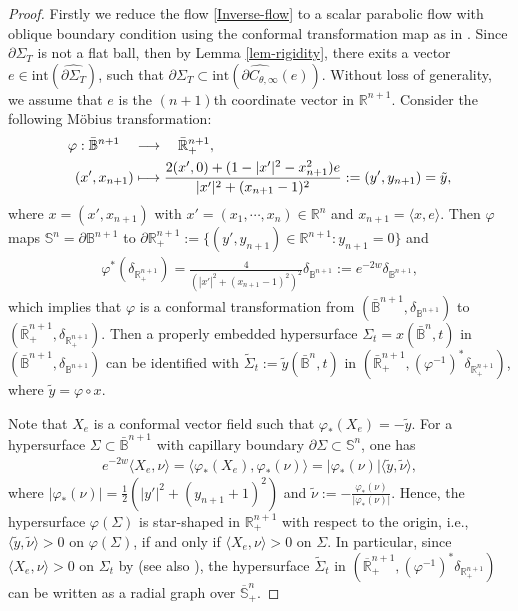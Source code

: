 \documentclass[11pt,reqno]{amsart}
\theoremstyle{definition}
\theoremstyle{remark}
\numberwithin{equation}{section}
\renewcommand{\(}{\left(}
\renewcommand{\)}{\right)}
\renewcommand{\widetilde}{\tilde}
\renewcommand{\-}{\overline}
\renewcommand{\d}{\delta}
\begin{document}
\begin{proof}
	Firstly we reduce the flow \eqref{Inverse-flow} to a scalar parabolic flow with oblique boundary condition using the conformal transformation map as in \cites{Scheuer-Wang-Xia2018,Weng-Xia2022}. Since $\partial\Sigma_T$ is not a flat ball, then by Lemma \ref{lem-rigidity}, there exits a vector $e\in \mathrm{int}(\widehat{\partial\Sigma_{T}})$, such that $\partial\Sigma_{T}\subset\mathrm{int}(\widehat{\partial C_{\theta,\infty}}(e))$. Without loss of generality, we assume that $e$ is the $(n+1)$th coordinate vector in $\mathbb{R}^{n+1}$. Consider the following M\"obius transformation:
	\begin{align}\label{conform-transform}
		\varphi: \bar{\mathbb B}^{n+1} \quad &\longrightarrow \quad \bar{\mathbb R}_{+}^{n+1},\notag\\
		(x',x_{n+1})  &\longmapsto  \frac{2(x',0)+(1-|x'|^2-x_{n+1}^2)e}{|x'|^2+(x_{n+1}-1)^2}:=(y',y_{n+1})=\tilde{y},
	\end{align}
	where $x=(x',x_{n+1})$ with $x'=(x_1,\cdots,x_n)\in \mathbb R^{n}$ and $x_{n+1}=\langle x,e\rangle$. Then $\varphi$ maps $\mathbb S^n=\partial \mathbb B^{n+1}$ to $\partial \mathbb R_{+}^{n+1}:=\{(y',y_{n+1})\in \mathbb R^{n+1}:y_{n+1}=0\}$ and
	\begin{align*}
		\varphi^\ast(\delta_{\mathbb R^{n+1}_{+}})=\frac{4}{(|x'|^2+(x_{n+1}-1)^2)^2}\delta_{\mathbb B^{n+1}}:=e^{-2w}\delta_{\mathbb B^{n+1}},
	\end{align*}
	which implies that $\varphi$ is a conformal transformation from $(\bar{\mathbb B}^{n+1},\delta_{\mathbb B^{n+1}})$ to $(\bar{\mathbb R}_{+}^{n+1},\delta_{\mathbb R_+^{n+1}})$. Then a properly embedded hypersurface $\Sigma_t=x(\bar{\mathbb B}^n,t)$ in $(\bar{\mathbb B}^{n+1},\delta_{\mathbb B^{n+1}})$ can be identified with $\widetilde{\Sigma}_t:=\tilde{y}(\bar{\mathbb B}^n,t)$ in $(\bar{\mathbb R}_{+}^{n+1},(\varphi^{-1})^\ast\delta_{\mathbb R_+^{n+1}})$, where $\tilde{y}=\varphi\circ x$.
	
	Note that $X_e$ is a conformal vector field such that $\varphi_{\ast}(X_e)=-\tilde{y}$. For a hypersurface $\Sigma \subset \bar{\mathbb B}^{n+1}$ with capillary boundary $\partial \Sigma\subset \mathbb S^n$, one has
	\begin{align*}
		e^{-2w}\langle X_e,\nu\rangle=\langle \varphi_\ast(X_e),\varphi_\ast(\nu)\rangle=|\varphi_{\ast}(\nu)|\langle \tilde y,\tilde\nu\rangle,
	\end{align*}
	where $|\varphi_\ast(\nu)|=\frac{1}2(|y'|^2+(y_{n+1}+1)^2)$ and $\tilde{\nu}:=-\frac{\varphi_\ast(\nu)}{|\varphi_\ast(\nu)|}$. Hence, the hypersurface $\varphi(\Sigma)$ is star-shaped in $\mathbb R_{+}^{n+1}$ with respect to the origin, i.e., $\langle \tilde{y},\tilde\nu\rangle>0$ on $\varphi(\Sigma)$,  if and only if $\langle X_e,\nu\rangle>0$  on $\Sigma$. In particular, since $\langle X_e,\nu\rangle>0$ on $\Sigma_t$ by \cite[Proposition 2.5]{HWYZ-2023}(see also \cite[Proposition 2.16]{Weng-Xia2022}), the hypersurface $\widetilde{\Sigma}_t$ in $(\-{\mathbb R}_{+}^{n+1},(\varphi^{-1})^\ast\d_{\mathbb R_+^{n+1}})$ can be written as a radial graph over $\-{\mathbb S}^{n}_{+}$.
	

\end{proof}
\end{document}
